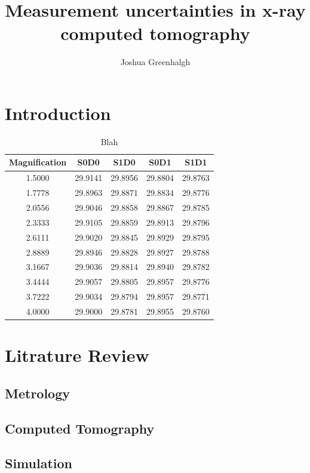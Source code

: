 \documentclass[
  twoside,
  11pt, a4paper,
  footinclude=true,
  headinclude=true,
  cleardoublepage=empty
]{scrbook}
\title{Measurement uncertainties in x-ray computed tomography}
\author{Joshua Greenhalgh}
\begin{document}
\maketitle





\chapter{Introduction}

\begin{table}
\caption{Blah}
\begin{tabular}{c|cccc}
\toprule
{} Magnification &     S0D0 &     S1D0 &     S0D1 &     S1D1 \\
\midrule
1.5000        &  29.9141 &  29.8956 &  29.8804 &  29.8763 \\
1.7778        &  29.8963 &  29.8871 &  29.8834 &  29.8776 \\
2.0556        &  29.9046 &  29.8858 &  29.8867 &  29.8785 \\
2.3333        &  29.9105 &  29.8859 &  29.8913 &  29.8796 \\
2.6111        &  29.9020 &  29.8845 &  29.8929 &  29.8795 \\
2.8889        &  29.8946 &  29.8828 &  29.8927 &  29.8788 \\
3.1667        &  29.9036 &  29.8814 &  29.8940 &  29.8782 \\
3.4444        &  29.9057 &  29.8805 &  29.8957 &  29.8776 \\
3.7222        &  29.9034 &  29.8794 &  29.8957 &  29.8771 \\
4.0000        &  29.9000 &  29.8781 &  29.8955 &  29.8760 \\
\bottomrule
\end{tabular}
\end{table}

\chapter{Litrature Review}
\section{Metrology}
\section{Computed Tomography}
\section{Simulation}
\end{document}
